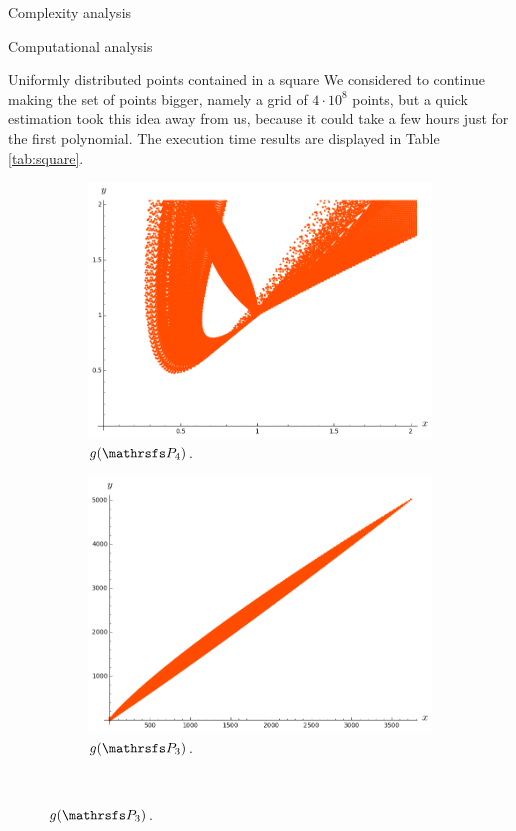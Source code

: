 \documentclass[11pt, a4paper, english, twoside, notitlepage, openright]{report}
\begin{document}
\begin{chapter}{Complexity analysis}
\begin{section}{Computational analysis}
\begin{subsection}{Uniformly distributed points contained in a square}
We considered to continue making the set of points bigger, namely a grid of $4\cdot 10^8$ points, but a quick estimation took this idea away from us, because it could take a few hours just for the first polynomial. The execution time results are displayed in Table \ref{tab:square}.

\begin{figure}[ht!]
\hspace{0.1cm}
\begin{subfigure}{.49\linewidth}\centering
\includegraphics[width=1\textwidth]{plots/ch5_08_P4prime.png}
\vspace{-0.4cm}\caption{$g(\PP_4)$.\label{fig:gP4}}
\end{subfigure}
\begin{subfigure}{.49\linewidth}\centering
\includegraphics[width=1\textwidth]{plots/ch5_04_P3.png}
\vspace{-0.4cm}\caption{$g(\PP_3)$.\label{fig:gP3}}
\end{subfigure}\\[1ex]
\vspace{-0.2cm}


\end{figure}
\end{subsection}
\end{section}
\end{chapter}
\end{document}
